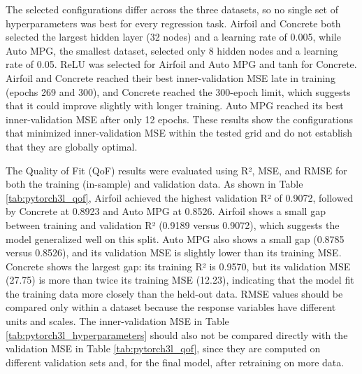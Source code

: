 \documentclass{article}
\begin{document}
The selected configurations differ across the three datasets, so no single set of hyperparameters was best for every regression task. Airfoil and Concrete both selected the largest hidden layer (32 nodes) and a learning rate of 0.005, while Auto MPG, the smallest dataset, selected only 8 hidden nodes and a learning rate of 0.05. ReLU was selected for Airfoil and Auto MPG and tanh for Concrete. Airfoil and Concrete reached their best inner-validation MSE late in training (epochs 269 and 300), and Concrete reached the 300-epoch limit, which suggests that it could improve slightly with longer training. Auto MPG reached its best inner-validation MSE after only 12 epochs. These results show the configurations that minimized inner-validation MSE within the tested grid and do not establish that they are globally optimal.
\medskip
\begin{table}[H]
    \centering
    \caption{PyTorch 3L Neural Network Quality of Fit Results}
    \label{tab:pytorch3l_qof}
    \small
\end{table}

The Quality of Fit (QoF) results were evaluated using R², MSE, and RMSE for both the training (in-sample) and validation data. As shown in Table \ref{tab:pytorch3l_qof}, Airfoil achieved the highest validation R² of 0.9072, followed by Concrete at 0.8923 and Auto MPG at 0.8526. Airfoil shows a small gap between training and validation R² (0.9189 versus 0.9072), which suggests the model generalized well on this split. Auto MPG also shows a small gap (0.8785 versus 0.8526), and its validation MSE is slightly lower than its training MSE. Concrete shows the largest gap: its training R² is 0.9570, but its validation MSE (27.75) is more than twice its training MSE (12.23), indicating that the model fit the training data more closely than the held-out data. RMSE values should be compared only within a dataset because the response variables have different units and scales. The inner-validation MSE in Table \ref{tab:pytorch3l_hyperparameters} should also not be compared directly with the validation MSE in Table \ref{tab:pytorch3l_qof}, since they are computed on different validation sets and, for the final model, after retraining on more data.
\medskip
\end{document}
